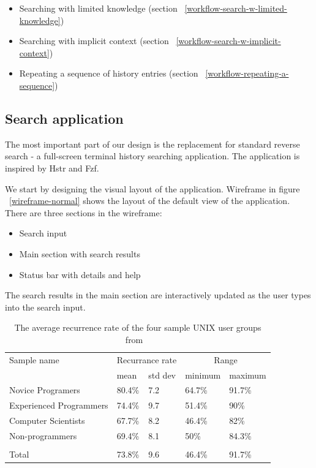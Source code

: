 \documentclass[thesis=M,english]{FITthesis}[2012/10/20]
\let\myCite\cite
\renewcommand\cite{\unskip~\myCite}
\let\myRef\ref
\renewcommand\ref{\unskip~\myRef}
\begin{document}
\begin{itemize}
    \item Searching with limited knowledge (section \ref{workflow-search-w-limited-knowledge})
    \item Searching with implicit context (section \ref{workflow-search-w-implicit-context})
    \item Repeating a sequence of history entries (section \ref{workflow-repeating-a-sequence})
\end{itemize}

\subsection{Search application}

The most important part of our design is the replacement for standard reverse search - a full-screen terminal history searching application. The application is inspired by Hstr and Fzf. 

We start by designing the visual layout of the application.
Wireframe in figure \ref{wireframe-normal} shows the layout of the default view of the application. There are three sections in the wireframe:

\begin{itemize}
    \item Search input
    \item Main section with search results
    \item Status bar with details and help
\end{itemize}

The search results in the main section are interactively updated as the user types into the search input. 


\begin{table}[]
\centering
\begin{tabular}{lllll}
\hline \hline
Sample name             & \multicolumn{2}{c}{Recurrance rate} & \multicolumn{2}{c}{Range} \\
                        & mean             & std dev          & minimum     & maximum     \\ \hline
Novice Programers       & 80.4\%           & 7.2              & 64.7\%      & 91.7\%      \\
Experienced Programmers & 74.4\%           & 9.7              & 51.4\%      & 90\%        \\
Computer Scientists      & 67.7\%           & 8.2              & 46.4\%      & 82\%        \\
Non-programmers         & 69.4\%           & 8.1              & 50\%        & 84.3\%      \\
                        &                  &                  &             &             \\
Total                   & 73.8\%           & 9.6              & 46.4\%      & 91.7\%      \\ \hline \hline 
\end{tabular}
\caption{The average recurrence rate of the four sample UNIX user groups from \cite{greenberg1993computer}}
\label{tab:recurrence_rate}
\end{table}
\end{document}
